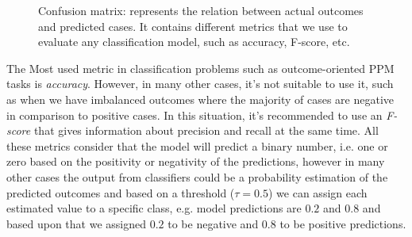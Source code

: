 \begin{figure}[htb]
	\begin{center}
		\caption[Confusion matrix:]{Confusion matrix: represents the relation between actual outcomes and predicted cases. It contains different metrics that we use to evaluate any classification model, such as accuracy, F-score, etc.}
		\label{fig:cm}
	\end{center}
\end{figure}


The Most used metric in classification problems such as outcome-oriented PPM tasks is \textit{accuracy}. However, in many other cases, it’s not suitable to use it, such as when we have imbalanced outcomes where the majority of cases are negative in comparison to positive cases. In this situation, it’s recommended to use an \textit{F-score} that gives information about precision and recall at the same time.  All these metrics consider that the model will predict a binary number, i.e. one or zero based on the positivity or negativity of the predictions, however in many other cases the output from classifiers could be a probability estimation of the predicted outcomes and based on a threshold ($\tau = 0.5$) we can assign each estimated value to a specific class, e.g. model predictions are $0.2$ and $0.8$ and based upon that we assigned $0.2$ to be negative and $0.8$ to be positive predictions.


